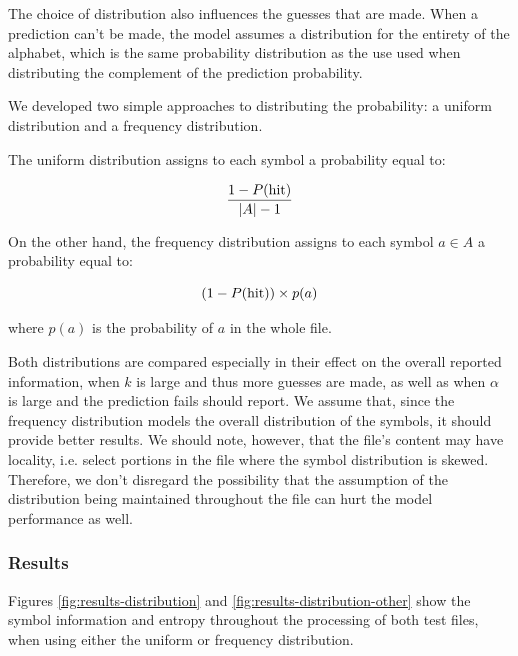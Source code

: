 \documentclass{article}
\begin{document}
The choice of distribution also influences the guesses that are made.
When a prediction can't be made, the model assumes a distribution for the entirety of the alphabet, which is the same probability distribution as the use used when distributing the complement of the prediction probability.

We developed two simple approaches to distributing the probability: a uniform distribution and a frequency distribution.

The uniform distribution assigns to each symbol a probability equal to:

$$
\frac{1 - P(\textnormal{hit})}{\vert A \vert - 1}
$$

On the other hand, the frequency distribution assigns to each symbol $a \in A$ a probability equal to:

$$
(1 - P(\textnormal{hit})) \times p(a)
$$

where $p(a)$ is the probability of $a$ in the whole file.

Both distributions are compared especially in their effect on the overall reported information, when $k$ is large and thus more guesses are made, as well as when $\alpha$ is large and the prediction fails should report.
We assume that, since the frequency distribution models the overall distribution of the symbols, it should provide better results.
We should note, however, that the file's content may have locality, i.e. select portions in the file where the symbol distribution is skewed.
Therefore, we don't disregard the possibility that the assumption of the distribution being maintained throughout the file can hurt the model performance as well.

\subsubsection{Results}

Figures \ref{fig:results-distribution} and \ref{fig:results-distribution-other} show the symbol information and entropy throughout the processing of both test files, when using either the uniform or frequency distribution.
\end{document}
